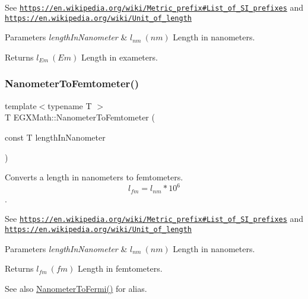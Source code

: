See \href{https://en.wikipedia.org/wiki/Metric_prefix#List_of_SI_prefixes}{\tt https\+://en.\+wikipedia.\+org/wiki/\+Metric\+\_\+prefix\#\+List\+\_\+of\+\_\+\+S\+I\+\_\+prefixes} and \href{https://en.wikipedia.org/wiki/Unit_of_length}{\tt https\+://en.\+wikipedia.\+org/wiki/\+Unit\+\_\+of\+\_\+length} 
\begin{DoxyParams}{Parameters}
{\em length\+In\+Nanometer} & $ l_{nm}\ (nm)$ Length in nanometers. \\
\hline
\end{DoxyParams}
\begin{DoxyReturn}{Returns}
$ l_{Em}\ (Em)$ Length in exameters. 
\end{DoxyReturn}
\mbox{\label{group___e_g_x_math-_conversions-_length_conversions-_s_i-_nanometer-_s_i_ga35ac002514f0d8cda8b1fe100b21f54b}} 
\subsubsection{\texorpdfstring{Nanometer\+To\+Femtometer()}{NanometerToFemtometer()}}
{\footnotesize\ttfamily template$<$typename T $>$ \\
T E\+G\+X\+Math\+::\+Nanometer\+To\+Femtometer (\begin{DoxyParamCaption}\item[{const T}]{length\+In\+Nanometer }\end{DoxyParamCaption})}



Converts a length in nanometers to femtometers. \[ l_{fm}=l_{nm} * 10^{6} \]. 

See \href{https://en.wikipedia.org/wiki/Metric_prefix#List_of_SI_prefixes}{\tt https\+://en.\+wikipedia.\+org/wiki/\+Metric\+\_\+prefix\#\+List\+\_\+of\+\_\+\+S\+I\+\_\+prefixes} and \href{https://en.wikipedia.org/wiki/Unit_of_length}{\tt https\+://en.\+wikipedia.\+org/wiki/\+Unit\+\_\+of\+\_\+length} 
\begin{DoxyParams}{Parameters}
{\em length\+In\+Nanometer} & $ l_{nm}\ (nm)$ Length in nanometers. \\
\hline
\end{DoxyParams}
\begin{DoxyReturn}{Returns}
$ l_{fm}\ (fm)$ Length in femtometers. 
\end{DoxyReturn}
\begin{DoxySeeAlso}{See also}
\mbox{\hyperlink{group___e_g_x_math-_conversions-_length_conversions-_s_i-_nanometer-_non-_s_i_ga9b708f83b519464f5ebb912bcaaf747d}{Nanometer\+To\+Fermi()}} for alias. 
\end{DoxySeeAlso}
\mbox{\label{group___e_g_x_math-_conversions-_length_conversions-_s_i-_nanometer-_s_i_ga235d244736444af6437d9086ae1f485d}} 
